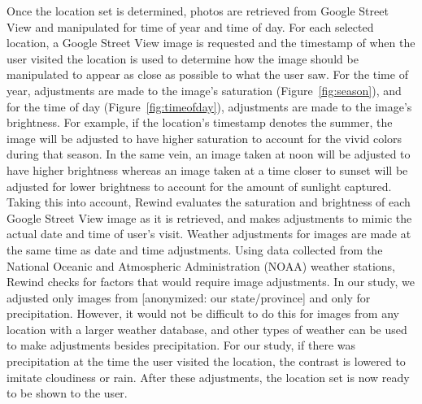 \documentclass{sigchi}
\begin{document}
Once the location set is determined, photos are retrieved from Google Street View and manipulated for time of year and time of day. For each selected location, a Google Street View image is requested and the timestamp of when the user visited the location is used to determine how the image should be manipulated to appear as close as possible to what the user saw. For the time of year, adjustments are made to the image's saturation (Figure~\ref{fig:season}), and for the time of day (Figure~\ref{fig:timeofday}), adjustments are made to the image's brightness. For example, if the location's timestamp denotes the summer, the image will be adjusted to have higher saturation to account for the vivid colors during that season. In the same vein, an image taken at noon will be adjusted to have higher brightness whereas an image taken at a time closer to sunset will be adjusted for lower brightness to account for the amount of sunlight captured. Taking this into account, Rewind evaluates the saturation and brightness of each Google Street View image as it is retrieved, and makes adjustments to mimic the actual date and time of user's visit. Weather adjustments for images are made at the same time as date and time adjustments. Using data collected from the National Oceanic and Atmospheric Administration (NOAA) weather stations, Rewind checks for factors that would require image adjustments. In our study, we adjusted only images from [anonymized: our state/province] and only for precipitation. However, it would not be difficult to do this for images from any location with a larger weather database, and other types of weather can be used to make adjustments besides precipitation. For our study, if there was precipitation at the time the user visited the location, the contrast is lowered to imitate cloudiness or rain. After these adjustments, the location set is now ready to be shown to the user.
\end{document}
